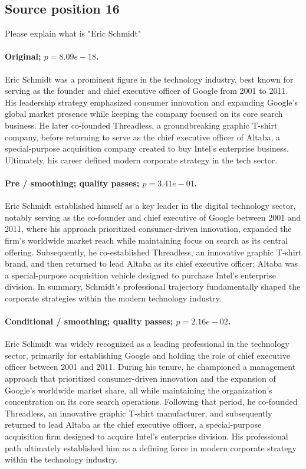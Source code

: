 \subsection*{Source position 16}
Please explain what is "Eric Schmidt"

\paragraph{Original; $p=8.09e-18$.} Eric Schmidt was a prominent figure in the technology industry, best known for serving as the founder and chief executive officer of Google from 2001 to 2011. His leadership strategy emphasized consumer innovation and expanding Google's global market presence while keeping the company focused on its core search business. He later co-founded Threadless, a groundbreaking graphic T-shirt company, before returning to serve as the chief executive officer of Altaba, a special-purpose acquisition company created to buy Intel's enterprise business. Ultimately, his career defined modern corporate strategy in the tech sector.


\paragraph{Pre / smoothing; quality passes; $p=3.41e-01$.} Eric Schmidt established himself as a key leader in the digital technology sector, notably serving as the co-founder and chief executive of Google between 2001 and 2011, where his approach prioritized consumer-driven innovation, expanded the firm's worldwide market reach while maintaining focus on search as its central offering. Subsequently, he co-established Threadless, an innovative graphic T-shirt brand, and then returned to lead Altaba as its chief executive officer; Altaba was a special-purpose acquisition vehicle designed to purchase Intel's enterprise division. In summary, Schmidt's professional trajectory fundamentally shaped the corporate strategies within the modern technology industry.

\paragraph{Conditional / smoothing; quality passes; $p=2.16e-02$.} Eric Schmidt was widely recognized as a leading professional in the technology sector, primarily for establishing Google and holding the role of chief executive officer between 2001 and 2011. During his tenure, he championed a management approach that prioritized consumer-driven innovation and the expansion of Google's worldwide market share, all while maintaining the organization's concentration on its core search operations. Following that period, he co-founded Threadless, an innovative graphic T-shirt manufacturer, and subsequently returned to lead Altaba as the chief executive officer, a special-purpose acquisition firm designed to acquire Intel's enterprise division. His professional path ultimately established him as a defining force in modern corporate strategy within the technology industry.

